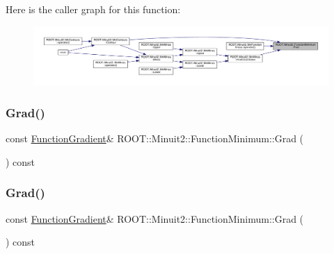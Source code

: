 Here is the caller graph for this function\+:
\nopagebreak
\begin{figure}[H]
\begin{center}
\leavevmode
\includegraphics[width=350pt]{d4/dfb/classROOT_1_1Minuit2_1_1FunctionMinimum_a72aa9fd2b33f1bb56c5b053d536cc32c_icgraph}
\end{center}
\end{figure}
\mbox{\label{classROOT_1_1Minuit2_1_1FunctionMinimum_ac97896abe1c4625c519c2b07e4e9b670}} 
\subsubsection{\texorpdfstring{Grad()}{Grad()}\hspace{0.1cm}{\footnotesize\ttfamily [1/3]}}
{\footnotesize\ttfamily const \mbox{\hyperlink{classROOT_1_1Minuit2_1_1FunctionGradient}{Function\+Gradient}}\& R\+O\+O\+T\+::\+Minuit2\+::\+Function\+Minimum\+::\+Grad (\begin{DoxyParamCaption}{ }\end{DoxyParamCaption}) const\hspace{0.3cm}{\ttfamily [inline]}}

\mbox{\label{classROOT_1_1Minuit2_1_1FunctionMinimum_ac97896abe1c4625c519c2b07e4e9b670}} 
\subsubsection{\texorpdfstring{Grad()}{Grad()}\hspace{0.1cm}{\footnotesize\ttfamily [2/3]}}
{\footnotesize\ttfamily const \mbox{\hyperlink{classROOT_1_1Minuit2_1_1FunctionGradient}{Function\+Gradient}}\& R\+O\+O\+T\+::\+Minuit2\+::\+Function\+Minimum\+::\+Grad (\begin{DoxyParamCaption}{ }\end{DoxyParamCaption}) const\hspace{0.3cm}{\ttfamily [inline]}}


